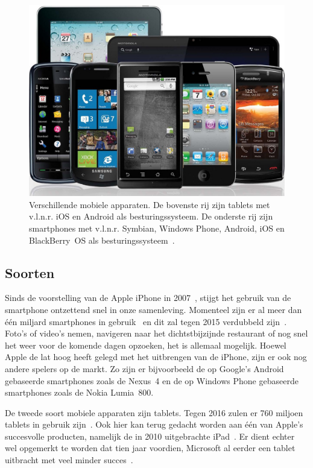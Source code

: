 \begin{figure}
  \centering
  \includegraphics[height=0.6\textwidth]{figuren/mobile-devices.jpg}
  \caption{Verschillende mobiele apparaten. De bovenste rij zijn tablets met v.l.n.r. iOS en Android als besturingssysteem. De onderste rij zijn smartphones met v.l.n.r. Symbian, Windows Phone, Android, iOS en BlackBerry~OS als besturingssysteem~\cite{Grady2013}.}
  \label{fig:devices}
\end{figure}

\subsection{Soorten}
Sinds de voorstelling van de Apple iPhone in 2007~\cite{David2011}, stijgt het gebruik van de smartphone ontzettend snel in onze samenleving.  
Momenteel zijn er al meer dan één miljard smartphones in gebruik~\cite{Yang2012} en dit zal tegen 2015 verdubbeld zijn~\cite{Gillett2012}.
Foto's of video's nemen, navigeren naar het dichtstbijzijnde restaurant of nog snel het weer voor de komende dagen opzoeken, het is allemaal mogelijk. 
Hoewel Apple de lat hoog heeft gelegd met het uitbrengen van de iPhone, zijn er ook nog andere spelers op de markt. 
Zo zijn er bijvoorbeeld de op Google's Android gebaseerde smartphones zoals de Nexus~4 en de op Windows Phone gebaseerde smartphones zoals de Nokia Lumia~800.

De tweede soort mobiele apparaten zijn tablets.
Tegen 2016 zulen er 760 miljoen tablets in gebruik zijn~\cite{Gillett2012}.
Ook hier kan terug gedacht worden aan één van Apple's succesvolle producten, namelijk de in 2010 uitgebrachte iPad~\cite{Apple2010}. 
Er dient echter wel opgemerkt te worden dat tien jaar voordien, Microsoft al eerder een tablet uitbracht met veel minder succes~\cite{Microsoft2000}.

